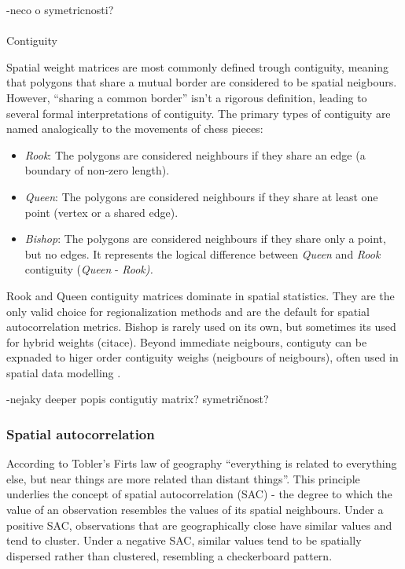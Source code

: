 \documentclass[
  english,
  12pt,
  a4paper,
]{article}
\makeatletter
\let\oldparagraph\paragraph
\renewcommand{\paragraph}{
    \@ifstar
      \xxxParagraphStar
      \xxxParagraphNoStar
  }
\newcommand{\xxxParagraphStar}[1]{\oldparagraph*{#1}\mbox{}}
\newcommand{\xxxParagraphNoStar}[1]{\oldparagraph{#1}\mbox{}}
\makeatother
\begin{document}
-neco o symetricnosti?

\paragraph{Contiguity}\label{sec-contiguity}

Spatial weight matrices are most commonly defined trough contiguity,
meaning that polygons that share a mutual border are considered to be
spatial neigbours. However, ``sharing a common border'' isn't a rigorous
definition, leading to several formal interpretations of contiguity. The
primary types of contiguity are named analogically to the movements of
chess pieces:

\begin{itemize}
\item
  \emph{Rook}: The polygons are considered neighbours if they share an
  edge (a boundary of non-zero length).
\item
  \emph{Queen}: The polygons are considered neighbours if they share at
  least one point (vertex or a shared edge).
\item
  \emph{Bishop}: The polygons are considered neighbours if they share
  only a point, but no edges. It represents the logical difference
  between \emph{Queen} and \emph{Rook} contiguity (\emph{Queen} -
  \emph{Rook).}
\end{itemize}

Rook and Queen contiguity matrices dominate in spatial statistics. They
are the only valid choice for regionalization methods and are the
default for spatial autocorrelation metrics. Bishop is rarely used on
its own, but sometimes its used for hybrid weights (citace). Beyond
immediate neigbours, contiguty can be expnaded to higer order contiguity
weighs (neigbours of neigbours), often used in spatial data modelling
\citep{floraxImpactsMisspecifiedSpatial1995}.

-nejaky deeper popis contigutiy matrix? symetričnost?

\subsubsection{Spatial autocorrelation}\label{spatial-autocorrelation}

According to Tobler's Firts law of geography ``everything is related to
everything else, but near things are more related than distant things''.
This principle underlies the concept of spatial autocorrelation (SAC) -
the degree to which the value of an observation resembles the values of
its spatial neighbours. Under a positive SAC, observations that are
geographically close have similar values and tend to cluster. Under a
negative SAC, similar values tend to be spatially dispersed rather than
clustered, resembling a checkerboard pattern.
\end{document}
